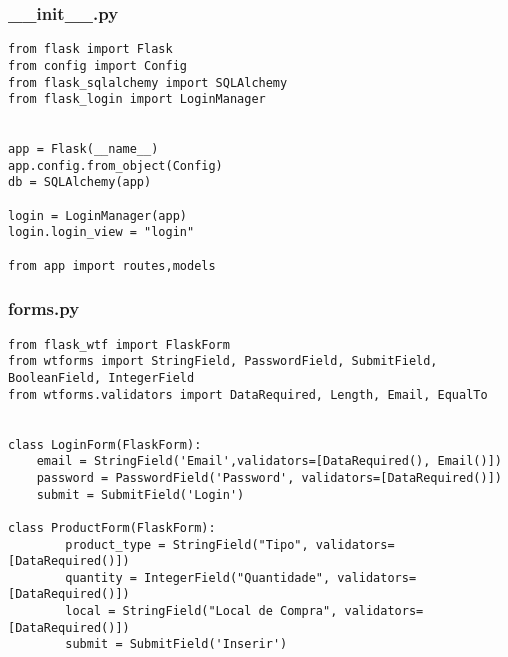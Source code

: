 \documentclass{report}
\begin{document}
\subsubsection{\_\_init\_\_.py}
\begin{lstlisting}
from flask import Flask
from config import Config
from flask_sqlalchemy import SQLAlchemy
from flask_login import LoginManager


app = Flask(__name__)
app.config.from_object(Config)
db = SQLAlchemy(app)

login = LoginManager(app)
login.login_view = "login"

from app import routes,models
\end{lstlisting}


\subsubsection{forms.py}
\begin{lstlisting}
from flask_wtf import FlaskForm
from wtforms import StringField, PasswordField, SubmitField, BooleanField, IntegerField
from wtforms.validators import DataRequired, Length, Email, EqualTo


class LoginForm(FlaskForm):
    email = StringField('Email',validators=[DataRequired(), Email()])
    password = PasswordField('Password', validators=[DataRequired()])
    submit = SubmitField('Login')

class ProductForm(FlaskForm):
        product_type = StringField("Tipo", validators=[DataRequired()])
        quantity = IntegerField("Quantidade", validators=[DataRequired()])
        local = StringField("Local de Compra", validators=[DataRequired()])
        submit = SubmitField('Inserir')
\end{lstlisting}
\end{document}
